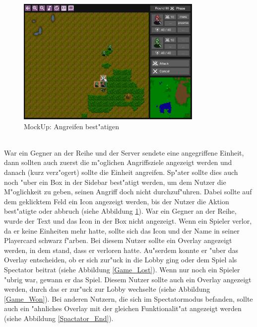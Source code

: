 \documentclass[12pt, titlepage]{scrartcl}
\newcounter{subsubsubsection}[subsubsection]
\begin{document}
			        \begin{figure}[H] 
    				    \centering
    				    \includegraphics[width=0.8\textwidth]{images/mockUps/Attack.png}
    				    \caption{MockUp: Angreifen best"atigen}
    				    \label{Attack}
			        \end{figure}
		        	\ \\ War ein Gegner an der Reihe und der Server sendete eine angegriffene Einheit, dann sollten auch zuerst die m"oglichen Angriffsziele angezeigt werden und danach (kurz verz"ogert) sollte die Einheit angreifen. Sp"ater sollte dies auch noch "uber ein Box in der Sidebar best"atigt werden, um dem Nutzer die M"oglichkeit zu geben, seinen Angriff doch nicht durchzuf"uhren. Dabei sollte auf dem geklicktem Feld ein Icon angezeigt werden, bis der Nutzer die Aktion best"atigte oder abbruch (siehe Abbildung \ref{Attack}). War ein Gegner an der Reihe, wurde der Text und das Icon in der Box nicht angezeigt.
			        Wenn ein Spieler verlor, da er keine Einheiten mehr hatte, sollte sich das Icon und der Name in seiner Playercard schwarz f"arben. Bei diesem Nutzer sollte ein Overlay angezeigt werden, in dem stand, dass er verloren hatte. Au"serdem konnte er "uber das Overlay entscheiden, ob er sich zur"uck in die Lobby ging oder dem Spiel als Spectator beitrat (siehe Abbildung \ref{Game_Lost}). Wenn nur noch ein Spieler "ubrig war, gewann er das Spiel. Diesem Nutzer sollte auch ein Overlay angezeigt werden, durch das er zur"uck zur Lobby wechselte (siehe Abbildung \ref{Game_Won}). Bei anderen Nutzern, die sich im Spectatormodus befanden, sollte auch ein "ahnliches Overlay mit der gleichen Funktionalit"at angezeigt werden (siehe Abbildung \ref{Spactator_End}).
\end{document}
